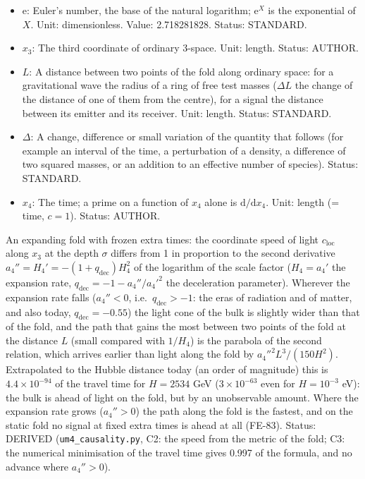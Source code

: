\documentclass[
  10pt,
]{article}
\begin{document}
\begin{itemize}
  \(\kappa\lambda_{\mathrm{F}} = 12H\) of the fold; in UM-4 a free
  parameter, bounded from below by the propagation of the gauge fields
  in the bulk. Unit: GeV (1/length). Value: \(H > 2534\) GeV, about 2.5
  TeV (from the invisible width of the Z boson). Status: AUTHOR.
\item
  \(\mathrm{e}\): Euler's number, the base of the natural logarithm;
  \(\mathrm{e}^{X}\) is the exponential of \(X\). Unit: dimensionless.
  Value: 2.718281828. Status: STANDARD.
\item
  \(x_3\): The third coordinate of ordinary 3-space. Unit: length.
  Status: AUTHOR.
\item
  \(L\): A distance between two points of the fold along ordinary space:
  for a gravitational wave the radius of a ring of free test masses
  (\(\Delta L\) the change of the distance of one of them from the
  centre), for a signal the distance between its emitter and its
  receiver. Unit: length. Status: STANDARD.
\item
  \(\Delta\): A change, difference or small variation of the quantity
  that follows (for example an interval of the time, a perturbation of a
  density, a difference of two squared masses, or an addition to an
  effective number of species). Status: STANDARD.
\item
  \(x_4\): The time; a prime on a function of \(x_4\) alone is
  \(\mathrm{d}/\mathrm{d}x_4\). Unit: length (= time, \(c = 1\)).
  Status: AUTHOR.
\end{itemize}

An expanding fold with frozen extra times: the coordinate speed of light
\(c_{\mathrm{loc}}\) along \(x_3\) at the depth \(\sigma\) differs from
1 in proportion to the second derivative
\(a_4'' = H_4' = -(1 + q_{\mathrm{dec}})H_4^2\) of the logarithm of the
scale factor (\(H_4 = a_4'\) the expansion rate,
\(q_{\mathrm{dec}} = -1 - a_4''/a_4'^2\) the deceleration parameter).
Wherever the expansion rate falls (\(a_4'' < 0\),
i.e.~\(q_{\mathrm{dec}} > -1\): the eras of radiation and of matter, and
also today, \(q_{\mathrm{dec}} = -0.55\)) the light cone of the bulk is
slightly wider than that of the fold, and the path that gains the most
between two points of the fold at the distance \(L\) (small compared
with \(1/H_4\)) is the parabola of the second relation, which arrives
earlier than light along the fold by \(a_4''^2L^3/(150H^2)\).
Extrapolated to the Hubble distance today (an order of magnitude) this
is \(4.4\times10^{-94}\) of the travel time for \(H = 2534\) GeV
(\(3\times10^{-63}\) even for \(H = 10^{-3}\) eV): the bulk is ahead of
light on the fold, but by an unobservable amount. Where the expansion
rate grows (\(a_4'' > 0\)) the path along the fold is the fastest, and
on the static fold no signal at fixed extra times is ahead at all
(FE-83). Status: DERIVED (\texttt{um4\_causality.py}, C2: the speed from
the metric of the fold; C3: the numerical minimisation of the travel
time gives 0.997 of the formula, and no advance where \(a_4'' > 0\)).
\end{document}
